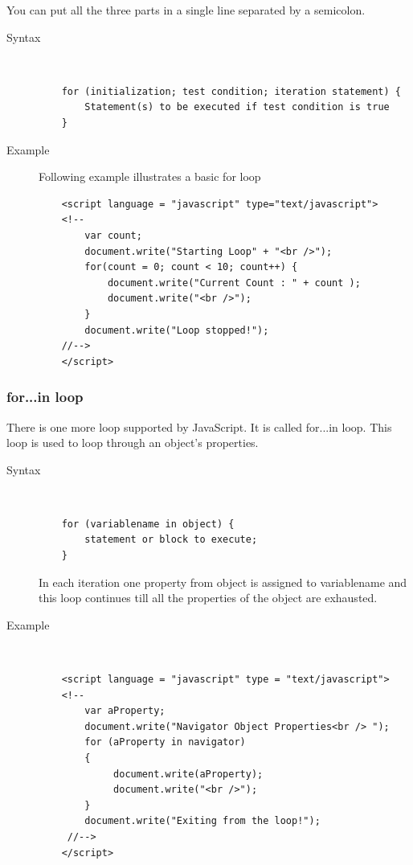 \documentclass[11pt,a4paper]{article}
\begin{document}
You can put all the three parts in a single line separated by a semicolon.

\begin{description}

\item[Syntax]\

\begin{verbatim}
    for (initialization; test condition; iteration statement) {
        Statement(s) to be executed if test condition is true
    }
\end{verbatim}

\item[Example]

Following example illustrates a basic for loop
\begin{verbatim}
    <script language = "javascript" type="text/javascript">
    <!--
        var count;
        document.write("Starting Loop" + "<br />");
        for(count = 0; count < 10; count++) {
            document.write("Current Count : " + count );
            document.write("<br />");
        }
        document.write("Loop stopped!");
    //-->
    </script>
\end{verbatim}
\end{description}

\subsubsection*{for...in loop}

There is one more loop supported by JavaScript. It is called for...in loop. This loop is used to loop through an object's properties.
\begin{description}
\item[Syntax]\

\begin{verbatim}
    for (variablename in object) {
        statement or block to execute;
    }
\end{verbatim}

In each iteration one property from object is assigned to variablename and this loop continues till all the properties of the object are exhausted.

\item[Example]\

\begin{verbatim}
    <script language = "javascript" type = "text/javascript">
    <!--
        var aProperty;
        document.write("Navigator Object Properties<br /> ");
        for (aProperty in navigator)
        {
             document.write(aProperty);
             document.write("<br />");
        }
        document.write("Exiting from the loop!");
     //-->
    </script>
\end{verbatim}
\end{description}
\end{document}
